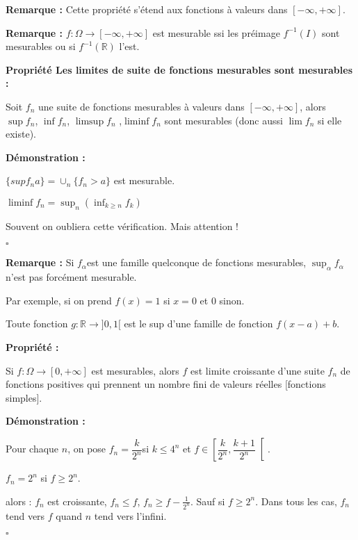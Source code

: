 \documentclass[10pt,a4paper,notitlepage ]{report}
\newcommand{\R}{\mathbb R}
\newcounter{th}
\newenvironment{propriete}[1][]{
	\begin{tcolorbox}
		\textbf{Propriété #1 : }
}
{\end{tcolorbox}}
\newenvironment{demo}[1][]{

	\textbf{Démonstration #1 :}
}{\begin{flushright}
	$\square$
\end{flushright}
}
\newenvironment{rem}{
	
	\textbf{Remarque :}}{}
\begin{document}
\begin{rem}
Cette propriété s'étend aux fonctions à valeurs dans $[ - \infty , + \infty ]$. 
\end{rem} 

\begin{rem}
$f : \Omega \longrightarrow [ - \infty , + \infty ] $ est mesurable ssi les préimage $f^{-1}  (I)$ sont mesurables ou si $f^{-1}  (\R)$ l'est.
\end{rem} 

\begin{propriete}[Les limites de suite de fonctions mesurables sont mesurables]
Soit $f_n$ une suite de fonctions mesurables à valeurs dans $ [ - \infty , + \infty ] $, alors $\sup f_n$, $\inf f_n$, $\limsup f_n$ ,$\liminf f_n$ sont mesurables (donc aussi $\lim f_n $ si elle existe).
\end{propriete}

\begin{demo}
$\lbrace sup f_n a \rbrace = \cup_n \lbrace f_n > a \rbrace $ est mesurable. 

$\liminf f_n = \sup_n \left( \inf_{k \geq n} f_k  \right)$

Souvent on oubliera cette vérification. Mais attention !

\end{demo}

\begin{rem}
Si $f_\alpha $est une famille quelconque de fonctions mesurables, $\sup_\alpha f_\alpha $ n'est pas forcément mesurable. 
\end{rem} 

Par exemple, si on prend $f(x) = 1$ si $x=0$ et 0 sinon. 

Toute fonction $g : \R \rightarrow ]0,1[ $ est le sup d'une famille de fonction $f(x-a) +b$.

\begin{propriete}
Si $f : \Omega \rightarrow [0, + \infty ]$ est mesurables, alors $f$ est limite croissante d'une suite $f_n$ de fonctions positives qui prennent un nombre fini de valeurs réelles [fonctions simples].
\end{propriete}

\begin{demo}
Pour chaque $n$, on pose $f_n = \dfrac{k}{2^n}$si $k \leq 4^n$ et $f \in \left[\dfrac{k}{2^n} , \dfrac{k+1}{2^n} \right[ $.

$f_n = 2^n$ si $f \geq 2^n$.

alors : $f_n$ est croissante, $f_n \leq f$, $f_n \geq f - \frac{1}{2^n} $. Sauf si $f \geq 2^n$. Dans tous les cas, $f_n$ tend vers $f$ quand $n$ tend vers l'infini. 
\end{demo}
\end{document}
